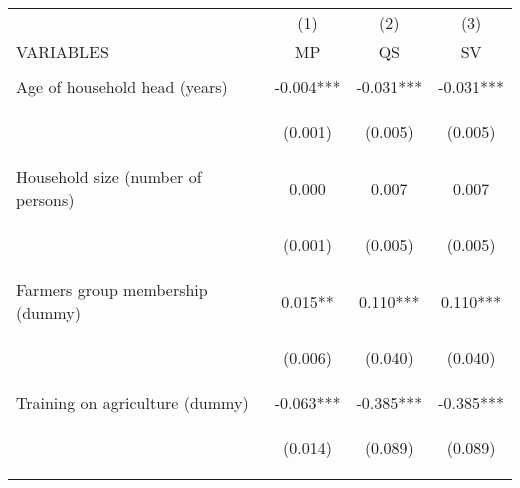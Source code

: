 \begin{center}
\begin{tabular}{lccc} \hline
 & (1) & (2) & (3) \\
VARIABLES & MP & QS & SV \\ \hline
\vspace{4pt} & \begin{footnotesize}\end{footnotesize} & \begin{footnotesize}\end{footnotesize} & \begin{footnotesize}\end{footnotesize} \\
Age of household head (years) & -0.004*** & -0.031*** & -0.031*** \\
\vspace{4pt} & \begin{footnotesize}(0.001)\end{footnotesize} & \begin{footnotesize}(0.005)\end{footnotesize} & \begin{footnotesize}(0.005)\end{footnotesize} \\
Household size (number of persons) & 0.000 & 0.007 & 0.007 \\
\vspace{4pt} & \begin{footnotesize}(0.001)\end{footnotesize} & \begin{footnotesize}(0.005)\end{footnotesize} & \begin{footnotesize}(0.005)\end{footnotesize} \\
Farmers group membership (dummy) & 0.015** & 0.110*** & 0.110*** \\
\vspace{4pt} & \begin{footnotesize}(0.006)\end{footnotesize} & \begin{footnotesize}(0.040)\end{footnotesize} & \begin{footnotesize}(0.040)\end{footnotesize} \\
Training on agriculture (dummy) & -0.063*** & -0.385*** & -0.385*** \\
\vspace{4pt} & \begin{footnotesize}(0.014)\end{footnotesize} & \begin{footnotesize}(0.089)\end{footnotesize} & \begin{footnotesize}(0.089)\end{footnotesize} \\

\end{tabular}
\end{center}
